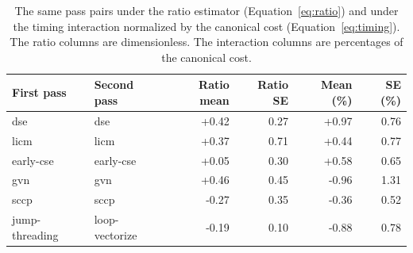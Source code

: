 \begin{table}[t]
\centering
\caption{The same pass pairs under the ratio estimator (Equation~\ref{eq:ratio}) and under the timing interaction normalized by the canonical cost (Equation~\ref{eq:timing}). The ratio columns are dimensionless. The interaction columns are percentages of the canonical cost.}
\label{tab:comparison}
\setlength{\tabcolsep}{3pt}
\begin{tabular}{|l|l|r|r|r|r|}
\hline
First pass & Second pass & Ratio mean & Ratio SE & Mean (\%) & SE (\%) \\
\hline
dse & dse & +0.42 & 0.27 & +0.97 & 0.76 \\
\hline
licm & licm & +0.37 & 0.71 & +0.44 & 0.77 \\
\hline
early-cse & early-cse & +0.05 & 0.30 & +0.58 & 0.65 \\
\hline
gvn & gvn & +0.46 & 0.45 & -0.96 & 1.31 \\
\hline
sccp & sccp & -0.27 & 0.35 & -0.36 & 0.52 \\
\hline
jump-threading & loop-vectorize & -0.19 & 0.10 & -0.88 & 0.78 \\
\hline
\end{tabular}
\end{table}
